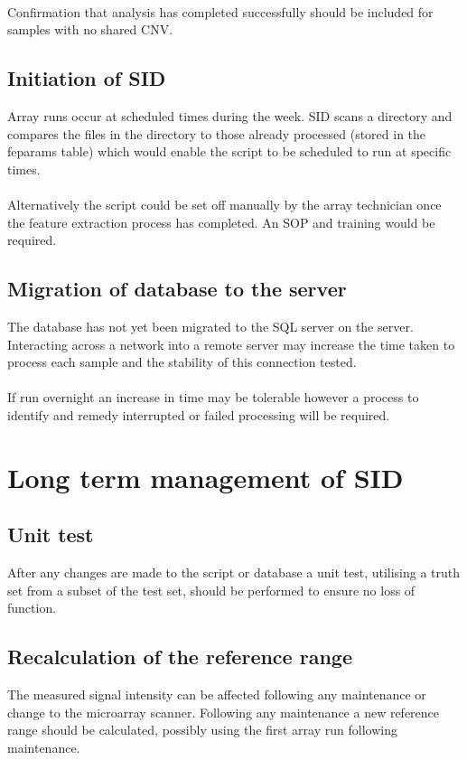 \paragraph*{}
Confirmation that analysis has completed successfully should be included for samples with no shared CNV.

\subsection{Initiation of SID}
Array runs occur at scheduled times during the week. SID scans a directory and compares the files in the directory to those already processed (stored in the feparams table) which would enable the script to be scheduled to run at specific times.
\paragraph*{}
Alternatively the script could be set off manually by the array technician once the feature extraction process has completed. An SOP and training would be required.

\subsection{Migration of database to the server}
The database has not yet been migrated to the SQL server on the server.  Interacting across a network into a remote server may increase the time taken to process each sample and the stability of this connection tested.
\paragraph*{}
If run overnight an increase in time may be tolerable however a process to identify and remedy interrupted or failed processing will be required. 

\section{Long term management of SID}
\subsection{Unit test}
After any changes are made to the script or database a unit test, utilising a truth set from a subset of the test set, should be performed to ensure no loss of function.

\subsection{Recalculation of the reference range}
The measured signal intensity can be affected following any maintenance or change to the microarray scanner. Following any maintenance a new reference range should be calculated, possibly using the first array run following maintenance. 
